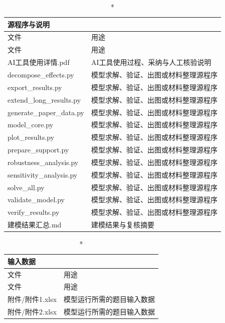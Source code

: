 \begin{longtable}{p{}p{}}
\caption*{源程序与说明}\\
\toprule 文件 & 用途\\
\midrule\endfirsthead
\toprule 文件 & 用途\\
\midrule\endhead
AI工具使用详情.pdf & AI工具使用过程、采纳与人工核验说明\\
decompose\_effects.py & 模型求解、验证、出图或材料整理源程序\\
export\_results.py & 模型求解、验证、出图或材料整理源程序\\
extend\_long\_results.py & 模型求解、验证、出图或材料整理源程序\\
generate\_paper\_data.py & 模型求解、验证、出图或材料整理源程序\\
model\_core.py & 模型求解、验证、出图或材料整理源程序\\
plot\_results.py & 模型求解、验证、出图或材料整理源程序\\
prepare\_support.py & 模型求解、验证、出图或材料整理源程序\\
robustness\_analysis.py & 模型求解、验证、出图或材料整理源程序\\
sensitivity\_analysis.py & 模型求解、验证、出图或材料整理源程序\\
solve\_all.py & 模型求解、验证、出图或材料整理源程序\\
validate\_model.py & 模型求解、验证、出图或材料整理源程序\\
verify\_results.py & 模型求解、验证、出图或材料整理源程序\\
建模结果汇总.md & 建模结果与复核摘要\\
\bottomrule
\end{longtable}

\begin{longtable}{p{}p{}}
\caption*{输入数据}\\
\toprule 文件 & 用途\\
\midrule\endfirsthead
\toprule 文件 & 用途\\
\midrule\endhead
附件/附件1.xlsx & 模型运行所需的题目输入数据\\
附件/附件2.xlsx & 模型运行所需的题目输入数据\\
\bottomrule
\end{longtable}

